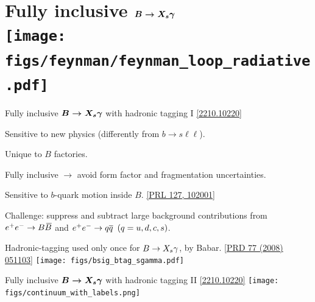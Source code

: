 \section{Fully inclusive $\boldsymbol{B\rightarrow X_s\gamma}$ \\ \hfill \texttt{[image: figs/feynman/feynman\_loop\_radiative.pdf]}}
\begin{frame}{Fully inclusive $\boldsymbol{B\rightarrow X_s\gamma}$ with hadronic tagging I \hfill \href{https://arxiv.org/abs/2210.10220}{[2210.10220]}}
\bi
\item {\footnotesize Sensitive to new physics (differently from $b\to s\ell\ell$).}
\item {\footnotesize Unique to $B$ factories.}
\item {\footnotesize Fully inclusive $\rightarrow$ avoid form factor and fragmentation uncertainties.}
\item {\footnotesize Sensitive to $b$-quark motion inside $B$. \hfill \href{https://journals.aps.org/prl/abstract/10.1103/PhysRevLett.127.102001}{\tiny [PRL 127, 102001]}}
\item {\footnotesize Challenge: suppress and subtract large background contributions from $e^+e^-\rightarrow B\kern 0.18em\overline{\kern -0.18em B}{}$ and $e^+e^-\rightarrow q\overline q\,\,\,(q=u,d,c,s)$.}
\item {\footnotesize Hadronic-tagging used only once for $B\rightarrow X_s\gamma$, by Babar. \hfill \href{https://journals.aps.org/prd/abstract/10.1103/PhysRevD.77.051103}{\tiny [PRD 77 (2008) 051103]}}
\ei
\centering
\texttt{[image: figs/bsig\_btag\_sgamma.pdf]}
\end{frame}
\begin{frame}{Fully inclusive $\boldsymbol{B\rightarrow X_s\gamma}$ with hadronic tagging II \hfill \href{https://arxiv.org/abs/2210.10220}{[2210.10220]}}
\bi
{}
\bi
{}
\ei
\ei
\centering
\texttt{[image: figs/continuum\_with\_labels.png]}
\end{frame}
